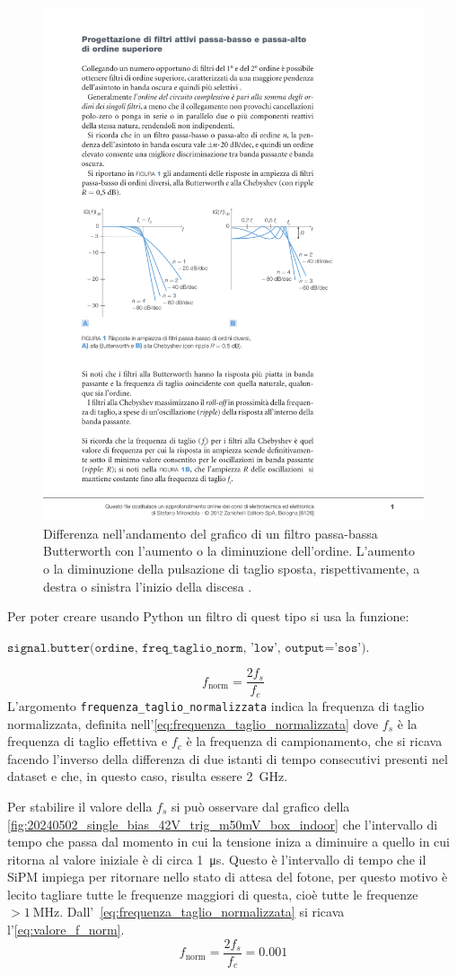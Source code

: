 \begin{figure}[h!]
    \centering
    \includegraphics[width=.65\linewidth]{img/butterworth_ordini_vettoriale.pdf}
    \caption{Differenza nell'andamento del grafico di un filtro passa-bassa Butterworth con l'aumento o la diminuzione dell'ordine. L'aumento
        o la diminuzione della pulsazione di taglio sposta, rispettivamente, a destra o sinistra l'inizio della discesa \cite{mirandola_2012_progettazione}.
    }
    \label{fig:grafico_Butterworth}
\end{figure}

Per poter creare usando Python un filtro di quest tipo si usa la funzione:

\( \texttt{signal.butter(ordine, freq\_taglio\_norm, 'low', output='sos')} \).

\begin{equation}
    f_\text{norm}=\frac{2 f_s}{f_c}
    \label{eq:frequenza_taglio_normalizzata}
\end{equation}
L'argomento \texttt{frequenza\_taglio\_normalizzata} indica la frequenza di taglio normalizzata, definita nell'\autoref*{eq:frequenza_taglio_normalizzata}
dove $f_s$ è la frequenza di taglio effettiva e $f_c$ è la frequenza di campionamento, che si ricava facendo l'inverso della differenza di
due istanti di tempo consecutivi presenti nel dataset e che, in questo caso, risulta essere \SI{2}{\giga\hertz}.

Per stabilire il valore della $f_s$ si può osservare dal grafico della \autoref*{fig:20240502_single_bias_42V_trig_m50mV_box_indoor} che
l'intervallo di tempo che passa dal momento in cui la tensione iniza a diminuire a quello in cui ritorna al valore iniziale è di circa
\SI{1}{\micro\second}. Questo è l'intervallo di tempo che il SiPM impiega per ritornare nello stato di attesa del fotone, per questo motivo è
lecito tagliare tutte le frequenze maggiori di questa, cioè tutte le frequenze $>\SI{1}{\mega\hertz}$. Dall'~\autoref*{eq:frequenza_taglio_normalizzata}
si ricava l'\autoref*{eq:valore_f_norm}.
\begin{equation}
    f_\text{norm}=\frac{2 f_s}{f_c}=0.001
    \label{eq:valore_f_norm}
\end{equation}

